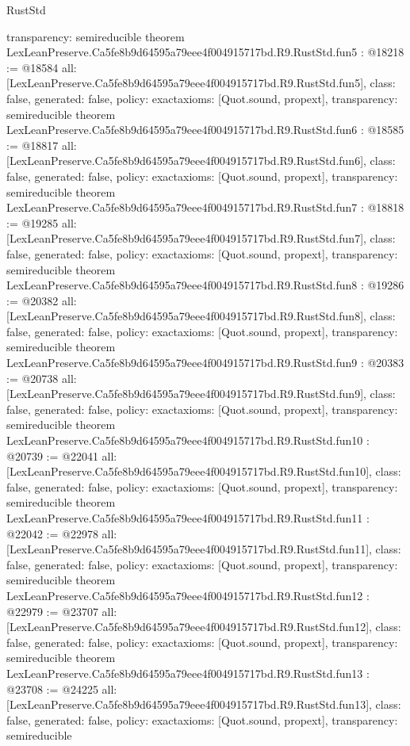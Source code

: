 \begin{lexlean}{RustStd}
\begin{coremodule}
{  transparency: semireducible
}
theorem LexLeanPreserve.Ca5fe8b9d64595a79eee4f004915717bd.R9.RustStd.fun5 : @18218 := @18584 {
  all: [LexLeanPreserve.Ca5fe8b9d64595a79eee4f004915717bd.R9.RustStd.fun5],
  class: false,
  generated: false,
  policy: exact{axioms: [Quot.sound, propext]},
  transparency: semireducible
}
theorem LexLeanPreserve.Ca5fe8b9d64595a79eee4f004915717bd.R9.RustStd.fun6 : @18585 := @18817 {
  all: [LexLeanPreserve.Ca5fe8b9d64595a79eee4f004915717bd.R9.RustStd.fun6],
  class: false,
  generated: false,
  policy: exact{axioms: [Quot.sound, propext]},
  transparency: semireducible
}
theorem LexLeanPreserve.Ca5fe8b9d64595a79eee4f004915717bd.R9.RustStd.fun7 : @18818 := @19285 {
  all: [LexLeanPreserve.Ca5fe8b9d64595a79eee4f004915717bd.R9.RustStd.fun7],
  class: false,
  generated: false,
  policy: exact{axioms: [Quot.sound, propext]},
  transparency: semireducible
}
theorem LexLeanPreserve.Ca5fe8b9d64595a79eee4f004915717bd.R9.RustStd.fun8 : @19286 := @20382 {
  all: [LexLeanPreserve.Ca5fe8b9d64595a79eee4f004915717bd.R9.RustStd.fun8],
  class: false,
  generated: false,
  policy: exact{axioms: [Quot.sound, propext]},
  transparency: semireducible
}
theorem LexLeanPreserve.Ca5fe8b9d64595a79eee4f004915717bd.R9.RustStd.fun9 : @20383 := @20738 {
  all: [LexLeanPreserve.Ca5fe8b9d64595a79eee4f004915717bd.R9.RustStd.fun9],
  class: false,
  generated: false,
  policy: exact{axioms: [Quot.sound, propext]},
  transparency: semireducible
}
theorem LexLeanPreserve.Ca5fe8b9d64595a79eee4f004915717bd.R9.RustStd.fun10 : @20739 := @22041 {
  all: [LexLeanPreserve.Ca5fe8b9d64595a79eee4f004915717bd.R9.RustStd.fun10],
  class: false,
  generated: false,
  policy: exact{axioms: [Quot.sound, propext]},
  transparency: semireducible
}
theorem LexLeanPreserve.Ca5fe8b9d64595a79eee4f004915717bd.R9.RustStd.fun11 : @22042 := @22978 {
  all: [LexLeanPreserve.Ca5fe8b9d64595a79eee4f004915717bd.R9.RustStd.fun11],
  class: false,
  generated: false,
  policy: exact{axioms: [Quot.sound, propext]},
  transparency: semireducible
}
theorem LexLeanPreserve.Ca5fe8b9d64595a79eee4f004915717bd.R9.RustStd.fun12 : @22979 := @23707 {
  all: [LexLeanPreserve.Ca5fe8b9d64595a79eee4f004915717bd.R9.RustStd.fun12],
  class: false,
  generated: false,
  policy: exact{axioms: [Quot.sound, propext]},
  transparency: semireducible
}
theorem LexLeanPreserve.Ca5fe8b9d64595a79eee4f004915717bd.R9.RustStd.fun13 : @23708 := @24225 {
  all: [LexLeanPreserve.Ca5fe8b9d64595a79eee4f004915717bd.R9.RustStd.fun13],
  class: false,
  generated: false,
  policy: exact{axioms: [Quot.sound, propext]},
  transparency: semireducible
}
\end{coremodule}
\end{lexlean}

